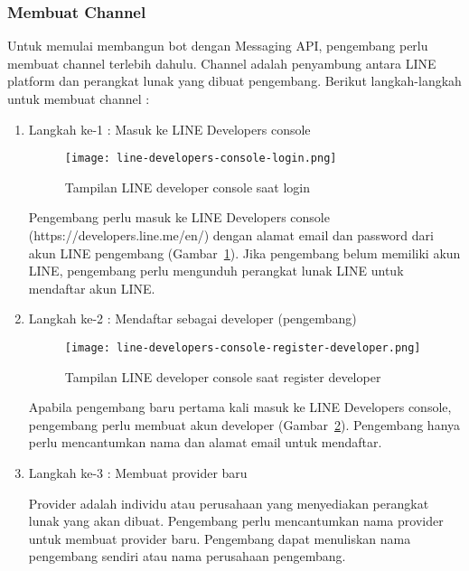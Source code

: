 \subsubsection{Membuat Channel}
Untuk memulai membangun bot dengan Messaging API, pengembang perlu membuat channel terlebih dahulu. Channel adalah penyambung antara LINE platform dan perangkat lunak yang dibuat pengembang. Berikut langkah-langkah untuk membuat channel :
\begin{enumerate}
\item Langkah ke-1 : Masuk ke LINE Developers console

\begin{figure}[H]
	\centering  
	\texttt{[image: line-developers-console-login.png]}  
	\caption[Tampilan LINE developer console saat login]{Tampilan LINE developer console saat login} 
	\label{fig:line-developers-console-login} 
\end{figure}

Pengembang perlu masuk ke LINE Developers console (https://developers.line.me/en/) dengan alamat email dan password dari akun LINE pengembang (Gambar~\ref{fig:line-developers-console-login}). Jika pengembang belum memiliki akun LINE, pengembang perlu mengunduh perangkat lunak LINE untuk mendaftar akun LINE.

\item Langkah ke-2 : Mendaftar sebagai developer (pengembang)

\begin{figure}[H]
	\centering  
	\texttt{[image: line-developers-console-register-developer.png]}  
	\caption[Tampilan LINE developer console saat register developer]{Tampilan LINE developer console saat register developer} 
	\label{fig:line-developers-console-register-developer} 
\end{figure}

Apabila pengembang baru pertama kali masuk ke LINE Developers console, pengembang perlu membuat akun developer (Gambar~\ref{fig:line-developers-console-register-developer}). Pengembang hanya perlu mencantumkan nama dan alamat email untuk mendaftar.

\item Langkah ke-3 : Membuat provider baru

Provider adalah individu atau perusahaan yang menyediakan perangkat lunak yang akan dibuat. Pengembang perlu mencantumkan nama provider untuk membuat provider baru. Pengembang dapat menuliskan nama pengembang sendiri atau nama perusahaan pengembang.


\end{enumerate}
